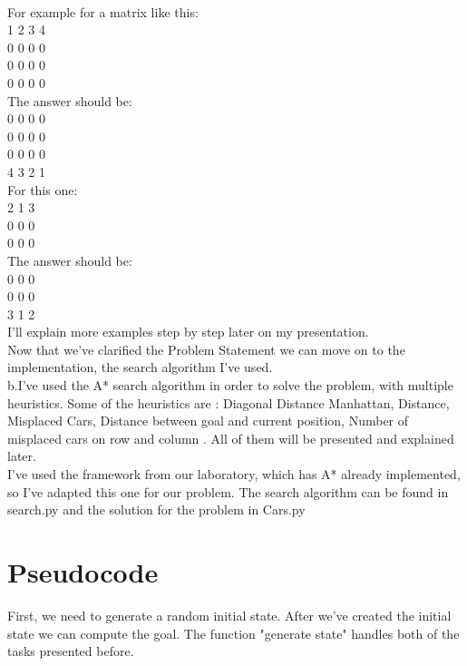 \documentclass[14pt]{article}
\begin{document}
\begin{center}
\\\vspace{5 mm}
For example for a matrix like this:
\\
1 2 3 4
\\
0 0 0 0
\\
0 0 0 0
\\
0 0 0 0
\\
The answer should be:
\\
0 0 0 0
\\
0 0 0 0
\\
0 0 0 0
\\
4 3 2 1
\\
For this one:
\\
2 1 3
\\
0 0 0
\\
0 0 0
\\
The answer should be:
\\
0 0 0
\\
0 0 0
\\
3 1 2
\\
I'll explain more examples step by step later on my presentation.
\\
Now that we've clarified the Problem Statement we can move on to the implementation, the search algorithm I've used.
\\\vspace{10}
b.I've used the A* search algorithm in order to solve the problem, with multiple heuristics. Some of the heuristics are : Diagonal Distance Manhattan, Distance, Misplaced Cars, Distance between goal and current position, Number of misplaced cars on row and column . All of them will be presented and explained later.
\\\vspace{10 mm}
I've used the framework from our laboratory, which has A* already implemented, so I've adapted this one for our problem. The search algorithm can be found in search.py and the solution for the problem in Cars.py
\newpage
\end{center}

\newpage
\section*{Pseudocode}
First, we need to generate a random initial state. After we've created the initial state we can compute the goal. The function "generate state" handles both of the tasks presented before.
\end{document}
